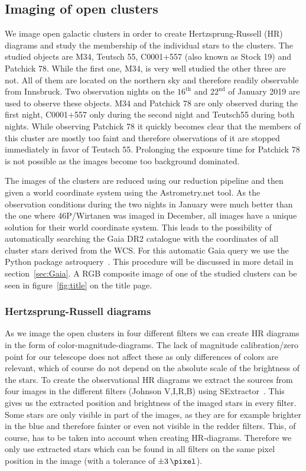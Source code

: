 \documentclass{article}
\begin{document}
\subsection{Imaging of open clusters}

We image open galactic clusters in order to create Hertzsprung-Russell (HR) diagrams and study the membership of the individual stars to the clusters. The studied objects are M34, Teutsch 55, C0001+557 (also known as Stock 19) and Patchick 78. While the first one, M34, is very well studied the other three are not. All of them are located on the northern sky and therefore readily observable from Innsbruck. Two observation nights on the $16^{\text{th}}$ and $22^{\text{nd}}$ of January 2019 are used to observe these objects. M34 and Patchick 78 are only observed during the first night, C0001+557  only during the second night and Teutsch55 during both nights. While observing Patchick 78 it quickly becomes clear that the members of this cluster are mostly too faint and therefore observations of it are stopped immediately in favor of Teutsch 55. Prolonging the exposure time for Patchick 78 is not possible as the images become too background dominated.

The images of the clusters are reduced using our reduction pipeline and then given a world coordinate system using the Astrometry.net tool. As the observation conditions during the two nights in January were much better than the one where 46P/Wirtanen was imaged in December, all images have a unique solution for their world coordinate system. This leads to the possibility of automatically searching the Gaia DR2 catalogue with the coordinates of all cluster stars derived from the WCS. For this automatic Gaia query we use the Python package astroquery~\parencite{astroquery}. This procedure will be discussed in more detail in section~\ref{sec:Gaia}. A RGB composite image of one of the studied clusters can be seen in figure~\ref{fig:title} on the title page.

\subsubsection{Hertzsprung-Russell diagrams}

As we image the open clusters in four different filters we can create HR diagrams in the form of color-magnitude-diagrams. The lack of magnitude calibration/zero point for our telescope does not affect these as only differences of colors are relevant, which of course do not depend on the absolute scale of the brightness of the stars. To create the observational HR diagrams we extract the sources from four images in the different filters (Johnson V,I,R,B) using SExtractor~\parencite{SExtractor}. This gives us the extracted position and brightness of the imaged stars in every filter. Some stars are only visible in part of the images, as they are for example brighter in the blue and therefore fainter or even not visible in the redder filters. This, of course, has to be taken into account when creating HR-diagrams. Therefore we only use extracted stars which can be found in all filters on the same pixel position in the image (with a tolerance of $\SI{\pm 3}{\pixel}$).
\end{document}
